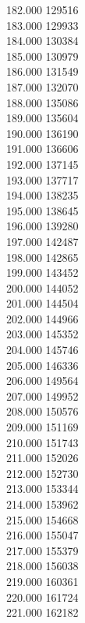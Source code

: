 { 182.000	129516 \\
 183.000	129933 \\
 184.000	130384 \\
 185.000	130979 \\
 186.000	131549 \\
 187.000	132070 \\
 188.000	135086 \\
 189.000	135604 \\
 190.000	136190 \\
 191.000	136606 \\
 192.000	137145 \\
 193.000	137717 \\
 194.000	138235 \\
 195.000	138645 \\
 196.000	139280 \\
 197.000	142487 \\
 198.000	142865 \\
 199.000	143452 \\
 200.000	144052 \\
 201.000	144504 \\
 202.000	144966 \\
 203.000	145352 \\
 204.000	145746 \\
 205.000	146336 \\
 206.000	149564 \\
 207.000	149952 \\
 208.000	150576 \\
 209.000	151169 \\
 210.000	151743 \\
 211.000	152026 \\
 212.000	152730 \\
 213.000	153344 \\
 214.000	153962 \\
 215.000	154668 \\
 216.000	155047 \\
 217.000	155379 \\
 218.000	156038 \\
 219.000	160361 \\
 220.000	161724 \\
 221.000	162182 \\
}
